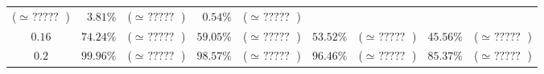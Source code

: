 \documentclass[10pt]{report}
\begin{document}
\begin{exercice}
\begin{center}
\begin{tabular}{|c|rl|rl|rl|rl|}
        ($\simeq \mbox{ ????? }$)
         & 
    
        $3.81\%$
         & 
    
        ($\simeq \mbox{ ????? }$)
         & 
    
        $0.54\%$
         & 
    
        ($\simeq \mbox{ ????? }$)
        
    \\ 

    
        $0.16$
         & 
    
        $74.24\%$
         & 
    
        ($\simeq \mbox{ ????? }$)
         & 
    
        $59.05\%$
         & 
    
        ($\simeq \mbox{ ????? }$)
         & 
    
        $53.52\%$
         & 
    
        ($\simeq \mbox{ ????? }$)
         & 
    
        $45.56\%$
         & 
    
        ($\simeq \mbox{ ????? }$)
        
    \\ 

    
        $0.2$
         & 
    
        $99.96\%$
         & 
    
        ($\simeq \mbox{ ????? }$)
         & 
    
        $98.57\%$
         & 
    
        ($\simeq \mbox{ ????? }$)
         & 
    
        $96.46\%$
         & 
    
        ($\simeq \mbox{ ????? }$)
         & 
    
        $85.37\%$
         & 
    
        ($\simeq \mbox{ ????? }$)
        
    \\ \cline{1-9}

    \end{tabular}

\end{center}


\end{exercice}
\end{document}

